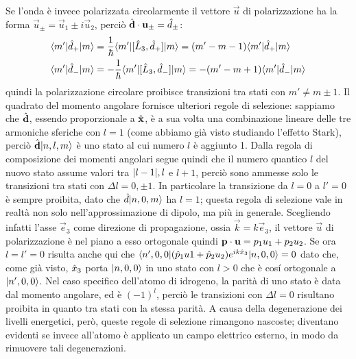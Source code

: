 Se l'onda è invece polarizzata circolarmente il vettore $\vec u$ di polarizzazione ha la forma $\vec u_\pm=\vec u_1\pm i\vec u_2$, perciò ${\hat{\mathbf{d}}}\cdot{\mathbf{u}_\pm}=\hat{d}_\pm$:
\begin{equation}
	\begin{aligned}
		\langle m'\rvert\hat{d}_+\lvert m\rangle&=\frac1{\hbar}\langle m'\rvert[\hat{L}_3,\hat{d}_+]\lvert m\rangle=(m'-m-1)\langle m'\rvert\hat{d}_+\lvert m\rangle\\
		\langle m'\rvert\hat{d}_-\lvert m\rangle&=-\frac1{\hbar}\langle m'\rvert[\hat{L}_3,\hat{d}_-]\lvert m\rangle=-(m'-m+1)\langle m'\rvert\hat{d}_-\lvert m\rangle
	\end{aligned}
\end{equation}
quindi la polarizzazione circolare proibisce transizioni tra stati con $m'\ne m\pm 1$.
Il quadrato del momento angolare fornisce ulteriori regole di selezione: sappiamo che $\hat{\mathbf{d}}$, essendo proporzionale a $\hat{\mathbf{x}}$, è a sua volta una combinazione lineare delle tre armoniche sferiche con $l=1$ (come abbiamo già visto studiando l'effetto Stark), perciò $\hat{\mathbf{d}}\lvert n,l,m\rangle$ è uno stato al cui numero $l$ è aggiunto 1.
Dalla regola di composizione dei momenti angolari segue quindi che il numero quantico $l$ del nuovo stato assume valori tra $\lvert l-1\rvert,l$ e $l+1$, perciò sono ammesse solo le transizioni tra stati con $\Delta l=0,\pm1$.
In particolare la transizione da $l=0$ a $l'=0$ è sempre proibita, dato che $\hat{d}\lvert n,0,m\rangle$ ha $l=1$; questa regola di selezione vale in realtà non solo nell'approssimazione di dipolo, ma più in generale.
Scegliendo infatti l'asse $\vec e_3$ come direzione di propagazione, ossia $\vec k=k\vec e_3$, il vettore $\vec u$ di polarizzazione è nel piano a esso ortogonale quindi ${\mathbf{p}}\cdot{\mathbf{u}}=p_1u_1+p_2u_2$.
Se ora $l=l'=0$ risulta anche qui che $\langle n',0,0\rvert(\hat{p}_1u1+\hat{p}_2u_2)e^{ik\hat{x}_3}\lvert n,0,0\rangle=0$ dato che, come già visto, $\hat{x}_3$ porta $\lvert n,0,0\rangle$ in uno stato con $l>0$ che è cos\'i ortogonale a $\lvert n',0,0\rangle$.
Nel caso specifico dell'atomo di idrogeno, la parità di uno stato è data dal momento angolare, ed è $(-1)^l$, perciò le transizioni con $\Delta l=0$ risultano proibita in quanto tra stati con la stessa parità.
A causa della degenerazione dei livelli energetici, però, queste regole di selezione rimangono nascoste; diventano evidenti se invece all'atomo è applicato un campo elettrico esterno, in modo da rimuovere tali degenerazioni.

